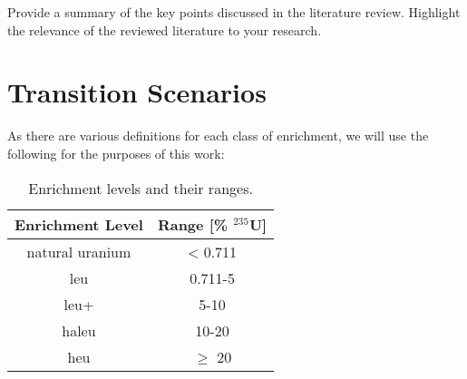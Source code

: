 
Provide a summary of the key points discussed in the literature review. Highlight the relevance of the reviewed literature to your research.


\section{Transition Scenarios}


As there are various definitions for each class of enrichment, we will use the following for the purposes of this work:

\begin{table}[htbp]
   \centering
   \caption{Enrichment levels and their ranges.}
   \label{tab:enrichment_levels}
   \begin{tabular}{c c}
      \hline
      \textbf{Enrichment Level} & \textbf{Range [\%  $^{235}$U]} \\
      \hline
      natural uranium & < 0.711 \\
      \gls{leu} & 0.711-5 \\
      \gls{leu+} & 5-10 \\
      \gls{haleu} & 10-20 \\
      \gls{heu} & $\geq$ 20  \\
      \hline
   \end{tabular}
\end{table}



